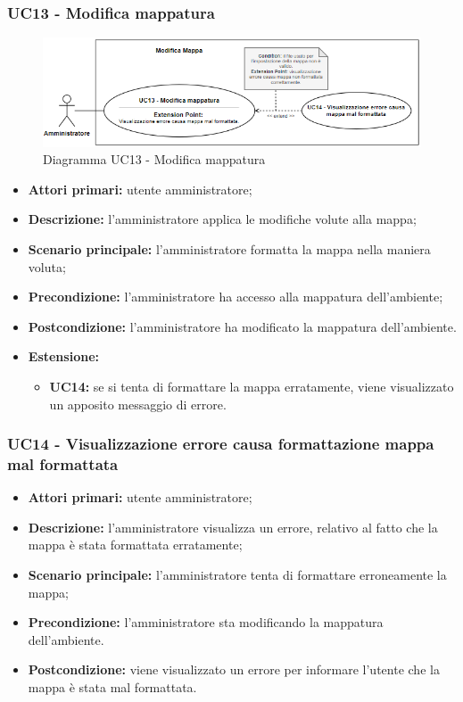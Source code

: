 	\subsubsection{UC13 - Modifica mappatura}
	\begin{figure}[H]
		\centering
		\includegraphics[width=15cm]{images/uc13.png}
		\caption{Diagramma UC13 - Modifica mappatura}
	\end{figure}
	\begin{itemize}
		\item \textbf{Attori primari:} utente amministratore;
		\item \textbf{Descrizione:} l'amministratore applica le modifiche volute alla mappa;
		\item \textbf{Scenario principale:} l'amministratore formatta la mappa nella maniera voluta;		
		\item \textbf{Precondizione:} l'amministratore ha accesso alla mappatura dell'ambiente;
		\item \textbf{Postcondizione:} l'amministratore ha modificato la mappatura dell'ambiente.
		\item \textbf{Estensione:}
		\begin{itemize}
			\item \textbf{UC14:} se si tenta di formattare la mappa erratamente, viene visualizzato un apposito messaggio di errore.
		\end{itemize}
	\end{itemize}

\subsubsection{UC14 - Visualizzazione errore causa formattazione mappa mal formattata}
	\begin{itemize}
		\item \textbf{Attori primari:} utente amministratore;
		\item \textbf{Descrizione:} l'amministratore visualizza un errore, relativo al fatto che la mappa è stata formattata erratamente;
		\item \textbf{Scenario principale:} l'amministratore tenta di formattare erroneamente la mappa;
		\item \textbf{Precondizione:} l'amministratore sta modificando la mappatura dell'ambiente.
		\item \textbf{Postcondizione:} viene visualizzato un errore per informare l'utente che la mappa è stata mal formattata.
	\end{itemize}

